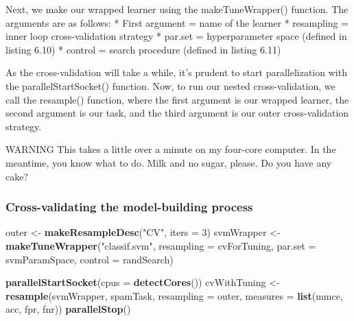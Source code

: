 \documentclass[
]{article}
\newenvironment{Shaded}{\begin{snugshade}}{\end{snugshade}}
\newcommand{\AttributeTok}[1]{\textcolor[rgb]{0.13,0.29,0.53}{#1}}
\newcommand{\DecValTok}[1]{\textcolor[rgb]{0.00,0.00,0.81}{#1}}
\newcommand{\FunctionTok}[1]{\textcolor[rgb]{0.13,0.29,0.53}{\textbf{#1}}}
\newcommand{\NormalTok}[1]{#1}
\newcommand{\OtherTok}[1]{\textcolor[rgb]{0.56,0.35,0.01}{#1}}
\newcommand{\StringTok}[1]{\textcolor[rgb]{0.31,0.60,0.02}{#1}}
\begin{document}
Next, we make our wrapped learner using the makeTuneWrapper() function.
The arguments are as follows: * First argument = name of the learner *
resampling = inner loop cross-validation strategy * par.set =
hyperparameter space (defined in listing 6.10) * control = search
procedure (defined in listing 6.11)

As the cross-validation will take a while, it's prudent to start
parallelization with the parallelStartSocket() function. Now, to run our
nested cross-validation, we call the resample() function, where the
first argument is our wrapped learner, the second argument is our task,
and the third argument is our outer cross-validation strategy.

WARNING This takes a little over a minute on my four-core computer. In
the meantime, you know what to do. Milk and no sugar, please. Do you
have any cake?

\subsubsection{Cross-validating the model-building
process}\label{cross-validating-the-model-building-process}

\begin{Shaded}
\begin{Highlighting}[]
\NormalTok{outer }\OtherTok{\textless{}{-}} \FunctionTok{makeResampleDesc}\NormalTok{(}\StringTok{"CV"}\NormalTok{, }\AttributeTok{iters =} \DecValTok{3}\NormalTok{)}
\NormalTok{svmWrapper }\OtherTok{\textless{}{-}} \FunctionTok{makeTuneWrapper}\NormalTok{(}\StringTok{"classif.svm"}\NormalTok{, }\AttributeTok{resampling =}\NormalTok{ cvForTuning,}
                              \AttributeTok{par.set =}\NormalTok{ svmParamSpace,}
                              \AttributeTok{control =}\NormalTok{ randSearch)}
\end{Highlighting}
\end{Shaded}

\begin{Shaded}
\begin{Highlighting}[]
\FunctionTok{parallelStartSocket}\NormalTok{(}\AttributeTok{cpus =} \FunctionTok{detectCores}\NormalTok{())}
\NormalTok{cvWithTuning }\OtherTok{\textless{}{-}} \FunctionTok{resample}\NormalTok{(svmWrapper, spamTask, }\AttributeTok{resampling =}\NormalTok{ outer, }
                         \AttributeTok{measures =} \FunctionTok{list}\NormalTok{(mmce, acc, fpr, fnr))}
\FunctionTok{parallelStop}\NormalTok{()}
\end{Highlighting}
\end{Shaded}
\end{document}
